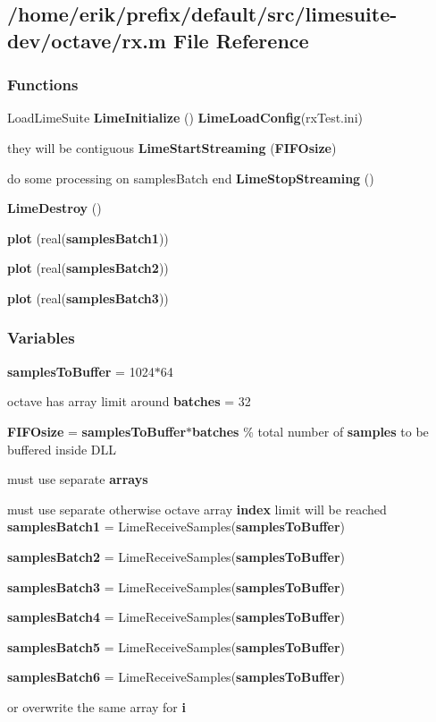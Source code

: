 \subsection{/home/erik/prefix/default/src/limesuite-\/dev/octave/rx.m File Reference}
\label{rx_8m}
\subsubsection*{Functions}
\begin{DoxyCompactItemize}
\item 
Load\+Lime\+Suite {\bf Lime\+Initialize} () {\bf Lime\+Load\+Config}(\textquotesingle{}rx\+Test.\+ini\textquotesingle{})
\item 
they will be contiguous {\bf Lime\+Start\+Streaming} ({\bf F\+I\+F\+Osize})
\item 
do some processing on samples\+Batch end {\bf Lime\+Stop\+Streaming} ()
\item 
{\bf Lime\+Destroy} ()
\item 
{\bf plot} (real({\bf samples\+Batch1}))
\item 
{\bf plot} (real({\bf samples\+Batch2}))
\item 
{\bf plot} (real({\bf samples\+Batch3}))
\end{DoxyCompactItemize}
\subsubsection*{Variables}
\begin{DoxyCompactItemize}
\item 
{\bf samples\+To\+Buffer} = 1024$\ast$64
\item 
octave has array limit around {\bf batches} = 32
\item 
{\bf F\+I\+F\+Osize} = {\bf samples\+To\+Buffer}$\ast${\bf batches} \% total number of {\bf samples} to be buffered inside D\+LL
\item 
must use separate {\bf arrays}
\item 
must use separate otherwise octave array {\bf index} limit will be reached {\bf samples\+Batch1} = Lime\+Receive\+Samples({\bf samples\+To\+Buffer})
\item 
{\bf samples\+Batch2} = Lime\+Receive\+Samples({\bf samples\+To\+Buffer})
\item 
{\bf samples\+Batch3} = Lime\+Receive\+Samples({\bf samples\+To\+Buffer})
\item 
{\bf samples\+Batch4} = Lime\+Receive\+Samples({\bf samples\+To\+Buffer})
\item 
{\bf samples\+Batch5} = Lime\+Receive\+Samples({\bf samples\+To\+Buffer})
\item 
{\bf samples\+Batch6} = Lime\+Receive\+Samples({\bf samples\+To\+Buffer})
\item 
or overwrite the same array for {\bf i}
\end{DoxyCompactItemize}


